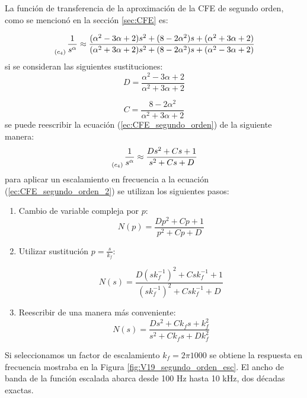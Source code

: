 	La función de transferencia de la aproximación de la CFE de segundo orden, como se mencionó en la sección \ref{sec:CFE} es:
	
	\begin{equation}
		\genfrac{}{}{0pt}{0}{}{_{(c_{4})}} \frac{1}{s^{\alpha}} \approx \frac{(\alpha^{2} - 3\alpha + 2) s^{2} + (8 - 2 \alpha^{2})s + (\alpha^{2} + 3\alpha + 2) }{(\alpha^{2} + 3\alpha + 2) s^{2} + (8 - 2 \alpha^{2})s + (\alpha^{2} - 3\alpha + 2)}
		\label{ec:CFE_segundo_orden}
	\end{equation}
	si se consideran las siguientes sustituciones:
	\begin{equation}
		D = \frac{\alpha^{2} - 3 \alpha + 2}{\alpha^{2} + 3\alpha + 2}
	\end{equation}
	
	\begin{equation}
		C = \frac{8 - 2 \alpha^{2}}{\alpha^{2} +  3 \alpha + 2}
	\end{equation}
	se puede reescribir la ecuación (\ref{ec:CFE_segundo_orden}) de la siguiente manera:
	\begin{equation}
		\genfrac{}{}{0pt}{0}{}{_{(c_{4})}} \frac{1}{s^{\alpha}} \approx  \frac{D s^{2} + Cs + 1}{s^{2} + Cs + D}
		\label{ec:CFE_segundo_orden_2}
	\end{equation}
	para aplicar un escalamiento en frecuencia a la ecuación (\ref{ec:CFE_segundo_orden_2}) se utilizan los siguientes pasos:
	
	\begin{enumerate}
		\item Cambio de variable compleja por $p$:
		\begin{equation}
			N(p) = \frac{D p^{2} + Cp + 1}{p^{2} + Cp + D}
		\end{equation}
		
		\item Utilizar sustitución $p = \frac{s}{k_{f}}$:
		
		\begin{equation}
			N(s) = \frac{D (sk_{f}^{-1})^{2} + Csk_{f}^{-1} + 1}{(sk_{f}^{-1})^{2} + Csk_{f}^{-1} + D}
		\end{equation}
		
		\item Reescribir de una manera más conveniente:
		\begin{equation}
			N(s) = \frac{D s^{2} + C k_{f}s + k_{f}^{2}}{s^{2} + C k_{f}s + Dk_{f}^{2}}
			\label{ec:CFE_segundo_final}
		\end{equation}
	\end{enumerate}
	Si seleccionamos un factor de escalamiento $k_{f} = 2 \pi 1000$ se obtiene la respuesta en frecuencia mostraba en la Figura \ref{fig:V19_segundo_orden_esc}. El ancho de banda de la función escalada abarca desde 100 Hz hasta 10 kHz, dos décadas exactas.
	
